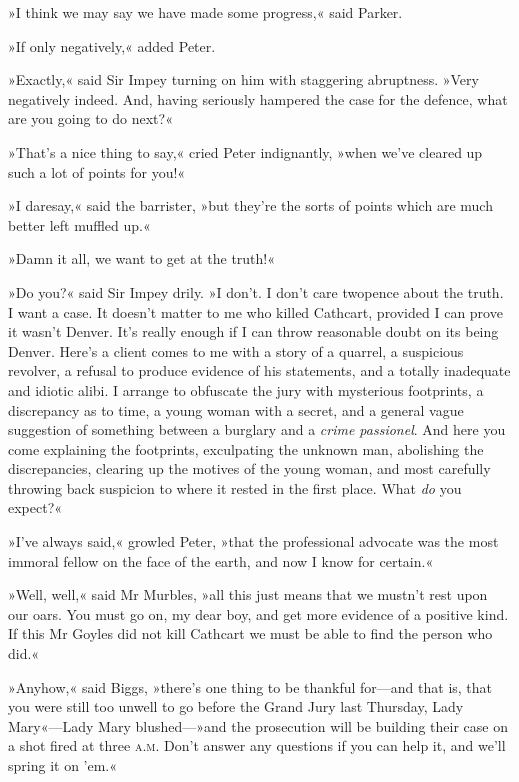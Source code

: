 »I think we may say we have made some progress,« said Parker.

»If only negatively,« added Peter.

»Exactly,« said Sir Impey turning on him with staggering abruptness.  »Very negatively indeed. And, having seriously hampered the case for the defence, what are you going to do next?«

»That's a nice thing to say,« cried Peter indignantly, »when we've cleared up such a lot of points for you!«

»I daresay,« said the barrister, »but they're the sorts of points which are much better left muffled up.«

»Damn it all, we want to get at the truth!«

»Do you?« said Sir Impey drily. »I don't. I don't care twopence about the truth. I want a case. It doesn't matter to me who killed Cathcart, provided I can prove it wasn't Denver. It's really enough if I can throw reasonable doubt on its being Denver. Here's a client comes to me with a story of a quarrel, a suspicious revolver, a refusal to produce evidence of his statements, and a totally inadequate and idiotic alibi. I arrange to obfuscate the jury with mysterious footprints, a discrepancy as to time, a young woman with a secret, and a general vague suggestion of something between a burglary and a \textit{crime passionel}. And here you come explaining the footprints, exculpating the unknown man, abolishing the discrepancies, clearing up the motives of the young woman, and most carefully throwing back suspicion to where it rested in the first place. What \textit{do} you expect?«

»I've always said,« growled Peter, »that the professional advocate was the most immoral fellow on the face of the earth, and now I know for certain.«

»Well, well,« said Mr Murbles, »all this just means that we mustn't rest upon our oars. You must go on, my dear boy, and get more evidence of a positive kind. If this Mr Goyles did not kill Cathcart we must be able to find the person who did.«

»Anyhow,« said Biggs, »there's one thing to be thankful for\allowbreak---\allowbreak and that is, that you were still too unwell to go before the Grand Jury last Thursday, Lady Mary«\allowbreak---\allowbreak Lady Mary blushed\allowbreak---\allowbreak »and the prosecution will be building their case on a shot fired at three \textsc{a.m.} Don't answer any questions if you can help it, and we'll spring it on 'em.«

